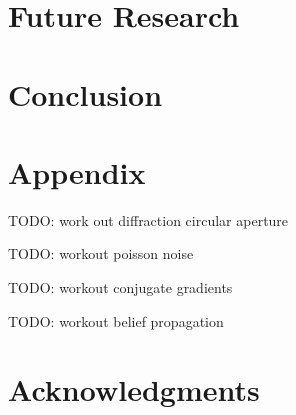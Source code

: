 \documentclass[journal]{IEEEtran}
\begin{document}
\section{Future Research}\label{sec:future-research}
\section{Conclusion}\label{sec:conclusion}
\section{Appendix}\label{sec:appendix}
TODO: work out diffraction circular aperture

TODO: workout poisson noise

TODO: workout conjugate gradients

TODO: workout belief propagation

\section*{Acknowledgments}
\newpage
\printbibliography
\end{document}
